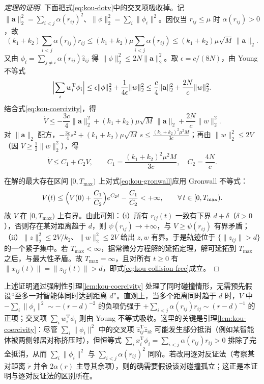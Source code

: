 \begin{proof}[定理的证明]
下面把式\eqref{eq:kou-dotv}中的交叉项吸收掉。记 $\|\mathbf a\|_2^2=\sum_{i<j}\alpha(r_{ij})^2$、$\|\phi\|_2^2=\sum_i\|\phi_i\|^2$。因仅当 $r_{ij}\le\mu$ 时 $\alpha(r_{ij})>0$，故
\begin{equation}
(k_1+k_2)\sum_{i<j}\alpha(r_{ij})r_{ij}
\le(k_1+k_2)\mu\sum_{i<j}\alpha(r_{ij})
\le(k_1+k_2)\mu\sqrt{M}\,\|\mathbf a\|_2 .
\end{equation}
又由 $\phi_i=\sum_{j\neq i}\alpha(r_{ij})\hat{z}_{ij}$ 得 $\|\phi\|_2^2\le2N\|\mathbf a\|_2^2$。取 $\epsilon=c/(8N)$，由 Young 不等式
\begin{equation}
\Bigl|\sum_i w_i^{\mathrm{T}}\phi_i\Bigr|
\le\epsilon\|\phi\|_2^2+\frac{1}{4\epsilon}\|w\|_2^2
\le\frac{c}{4}\|\mathbf a\|_2^2+\frac{2N}{c}\|w\|_2^2 .
\end{equation}
结合式\eqref{eq:kou-coercivity}，得
\begin{equation}
\dot{V}
\le-\frac{3c}{4}\|\mathbf a\|_2^2
+(k_1+k_2)\mu\sqrt{M}\,\|\mathbf a\|_2
+\frac{2N}{c}\|w\|_2^2 .
\end{equation}
对 $\|\mathbf a\|_2$ 配方，$-\frac{3c}{4}s^2+(k_1+k_2)\mu\sqrt{M}\,s\le\frac{(k_1+k_2)^2\mu^2M}{3c}$；再由 $\|w\|_2^2\le2V$（因 $V\ge\tfrac12\|w\|_2^2$），得
\begin{equation}
\dot{V}\le C_1+C_2V,
\qquad
C_1=\frac{(k_1+k_2)^2\mu^2M}{3c},\quad
C_2=\frac{4N}{c}.
\label{eq:kou-gronwall}
\end{equation}

在解的最大存在区间 $[0,T_{\max})$ 上对式\eqref{eq:kou-gronwall}应用 Gronwall 不等式：
\begin{equation}
V(t)\le\Bigl(V(0)+\frac{C_1}{C_2}\Bigr)e^{C_2t}-\frac{C_1}{C_2}<+\infty,
\qquad \forall\,t\in[0,T_{\max}).
\end{equation}
故 $V$ 在 $[0,T_{\max})$ 上有界。由此可知：（i）所有 $r_{ij}(t)$ 一致有下界 $d+\delta$（$\delta>0$），否则存在某对距离趋于 $d$，则 $\psi(r_{ij})\to+\infty$，与 $V\ge\psi(r_{ij})$ 有界矛盾；（ii）$\|z\|_2^2\le2V/k_2$、$\|w\|_2^2\le2V$ 给出 $z,w$ 有界。于是轨迹位于 $\{\|z_{ij}\|>d\}$ 的一个紧子集中。若 $T_{\max}<\infty$，据常微分方程解的延拓定理，解可延拓到 $T_{\max}$ 之后，与最大性矛盾。故 $T_{\max}=\infty$，且对所有 $t\ge0$ 有 $\|x_{ij}(t)\|=\|z_{ij}(t)\|>d$，即式\eqref{eq:kou-collision-free}成立。
\end{proof}

\begin{remark}[关于同时碰撞]
上述证明通过强制性引理\ref{lem:kou-coercivity} 处理了同时碰撞情形，无需预先假设``至多一对智能体同时达到距离 $d$''。直观上，当多个距离同时趋于 $d$ 时，$\dot{V}$ 中 $-\sum_i\|\phi_i\|^2\sim-(r-d)^{-2}$ 的负项仍强于 $+\sum_{i<j}\alpha(r_{ij})r_{ij}\sim(r-d)^{-1}$ 的正项；交叉项 $\sum_i w_i^{\mathrm{T}}\phi_i$ 则由 Young 不等式吸收。这里的关键是引理\ref{lem:kou-coercivity}：尽管 $\sum_i\|\phi_i\|^2$ 中的交叉项 $\hat{z}_{ij}^{\mathrm{T}}\hat{z}_{ik}$ 可能发生部分抵消（例如某智能体被两侧邻居对称挤压时），但恒等式 $\sum_i x_i^{\mathrm{T}}\phi_i=\sum_{i<j}\alpha(r_{ij})r_{ij}>0$ 排除了完全抵消，从而 $\sum_i\|\phi_i\|^2$ 与 $\sum_{i<j}\alpha(r_{ij})^2$ 同阶。若改用逐对反证法（考察某对距离 $\dot r$ 并令 $2\alpha(r)$ 主导其余项），则的确需要假设该对碰撞孤立；这正是本证明与逐对反证法的区别所在。
\end{remark}

